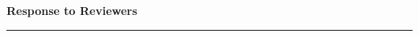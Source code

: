 \documentclass[12pt,a4paper]{article}
\begin{document}
{\Large\bf Response to Reviewers}\\[1em]
\hrule

\setcounter{secnumdepth}{3}
\setcounter{tocdepth}{2}
\tableofcontents
\label{toc}
\clearpage


\clearpage

{}
\begin{revcomment}[2]
\end{revcomment}
\begin{revcomment}[2]
\end{revcomment}
\begin{revcomment}[2]
\end{revcomment}
{}
\end{document}
